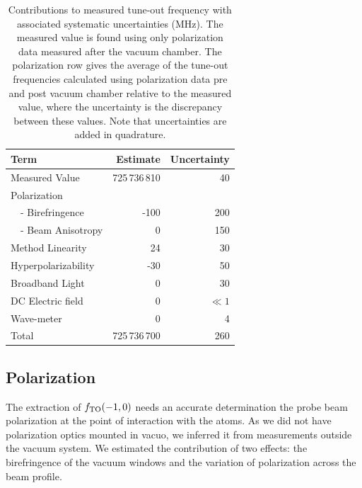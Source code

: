 	\begin{table}[t]
	\centering
	\begin{tabular}{l|r|r}
	Term              & Estimate &  Uncertainty \\
	\hline
	Measured Value      & 725\,736\,810             & 40      \\
	Polarization        & & \\
	\, \, - Birefringence & -100                   & 200   \\
	\, \, - Beam Anisotropy & 0                   & 150   \\
	Method Linearity    & 24                   & 30       \\
	Hyperpolarizability           & -30                   & 50   \\
	Broadband Light     & 0                     & 30      \\
	DC Electric field   & 0                     & \(\ll 1\) \\
	Wave-meter          & 0                     & 4    \\
	\hline
	Total               &  725\,736\,700            &  260
	\end{tabular}
	\caption{Contributions to measured tune-out frequency with associated systematic uncertainties (MHz). The measured value is found using only polarization data measured after the vacuum chamber. The polarization row gives the average of the tune-out frequencies calculated using polarization data pre and post vacuum chamber relative to the measured value, where the uncertainty is the discrepancy between these values. Note that uncertainties are added in quadrature.}
	\label{tab:results}
	\end{table}

\subsection{Polarization}

	 The extraction of \(f_\mathrm{TO}(-1,0)\) needs an accurate determination the probe beam polarization at the point of interaction with the atoms. 
	 As we did not have polarization optics mounted in vacuo, we inferred it from measurements outside the vacuum system. 
	 We estimated the contribution of two effects: the birefringence of the vacuum windows and the variation of polarization across the beam profile.
	 



